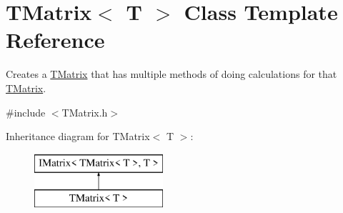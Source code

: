 \hypertarget{class_t_matrix}{}\section{T\+Matrix$<$ T $>$ Class Template Reference}
\label{class_t_matrix}


Creates a \mbox{\hyperlink{class_t_matrix}{T\+Matrix}} that has multiple methods of doing calculations for that \mbox{\hyperlink{class_t_matrix}{T\+Matrix}}.  




{\ttfamily \#include $<$T\+Matrix.\+h$>$}

Inheritance diagram for T\+Matrix$<$ T $>$\+:\begin{figure}[H]
\begin{center}
\leavevmode
\includegraphics[height=2.000000cm]{class_t_matrix}
\end{center}
\end{figure}
